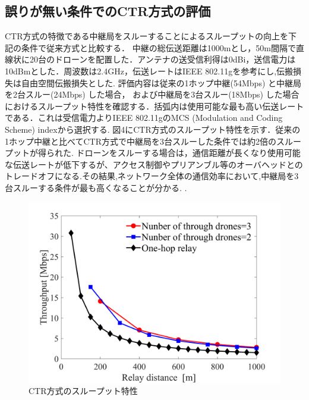 \documentclass[a4paper,10pt]{ltjsarticle}
\begin{document}
\subsection{誤りが無い条件でのCTR方式の評価}
CTR方式の特徴である中継局をスルーすることによるスループットの向上を下記の条件で従来方式と比較する．%
中継の総伝送距離は1000mとし，50m間隔で直線状に20台のドローンを配置した．アンテナの送受信利得は0dBi，送信電力は10dBmとした．周波数は2.4GHz，伝送レートはIEEE 802.11gを参考にし,伝搬損失は自由空間伝搬損失とした.
評価内容は従来の1ホップ中継(54Mbps) と中継局を2台スルー(24Mbps) した場合，
および中継局を3台スルー(18Mbps) した場合におけるスループット特性を確認する．括弧内は使用可能な最も高い伝送レートである．これは受信電力よりIEEE 802.11gのMCS (Modulation and Coding Scheme) indexから選択する.
図4にCTR方式のスループット特性を示す．従来の1ホップ中継と比べてCTR方式で中継局を3台スルーした条件では約2倍のスループットが得られた.
ドローンをスルーする場合は，通信距離が長くなり使用可能な伝送レートが低下するが、アクセス制御やプリアンブル等のオーバヘッドとのトレードオフになる.その結果,ネットワーク全体の通信効率において,中継局を3台スルーする条件が最も高くなることが分かる.
.
\begin{figure}[H]
  \centering
  \includegraphics[width=\linewidth]{throughtput_vs_placement_50m_max_distance_3.pdf} %
  \caption{CTR方式のスループット特性}
  \label{fig:throughput_through} %
\end{figure}
\end{document}
